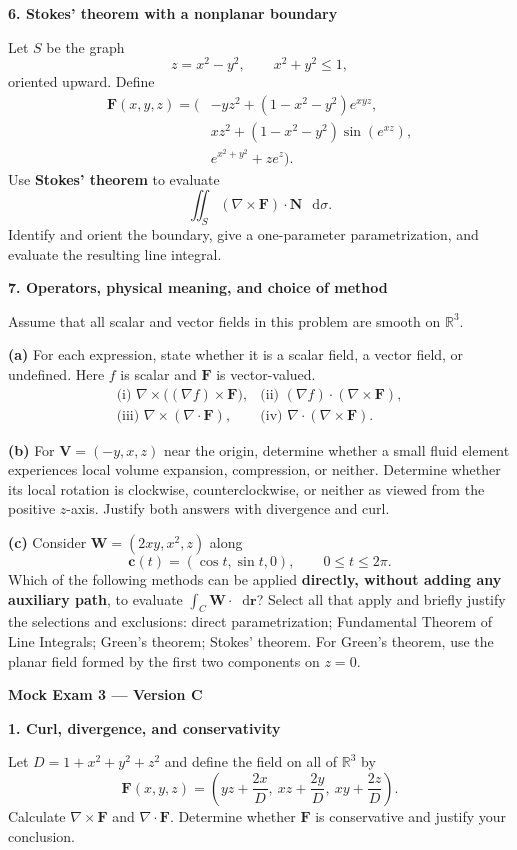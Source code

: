 \documentclass[11pt,letterpaper]{article}
\newcommand{\curl}{\nabla\times}
\newcommand{\dv}{\nabla\cdot}
\renewcommand{\vec}[1]{\mathbf{#1}}
\newcommand{\dd}{\mathop{}\!\mathrm{d}}
\newcommand{\grad}{\nabla}
\newcommand{\examproblem}[3]{%
  \par\medskip\Needspace{5\baselineskip}
  \noindent\textbf{#1. #2}\par\nobreak
}
\begin{document}
\examproblem{6}{Stokes' theorem with a nonplanar boundary}{20}
Let $S$ be the graph
\[
z=x^2-y^2,\qquad x^2+y^2\le1,
\]
oriented upward. Define
\[
\begin{aligned}
\vec F(x,y,z)=\bigl(&-yz^2+(1-x^2-y^2)e^{xyz},\\
&xz^2+(1-x^2-y^2)\sin(e^{xz}),\\
&e^{x^2+y^2}+ze^z\bigr).
\end{aligned}
\]
Use \textbf{Stokes' theorem} to evaluate
\[
\iint_S(\curl\vec F)\cdot\vec N\,\dd\sigma.
\]
Identify and orient the boundary, give a one-parameter parametrization,
and evaluate the resulting line integral.

\examproblem{7}{Operators, physical meaning, and choice of method}{14}
Assume that all scalar and vector fields in this problem are smooth on
$\mathbb R^3$.

\textbf{(a)} For each expression, state whether it is a scalar
field, a vector field, or undefined. Here $f$ is scalar and $\vec F$ is
vector-valued.
\[
\begin{array}{ll}
\text{(i) }\curl\bigl((\grad f)\times\vec F\bigr),&
\text{(ii) }(\grad f)\cdot(\curl\vec F),\\[3pt]
\text{(iii) }\curl(\dv\vec F),&
\text{(iv) }\dv(\curl\vec F).
\end{array}
\]

\textbf{(b)} For $\vec V=(-y,x,z)$ near the origin, determine
whether a small fluid element experiences local volume expansion,
compression, or neither. Determine whether its local rotation is
clockwise, counterclockwise, or neither as viewed from the positive
$z$-axis. Justify both answers with divergence and curl.

\textbf{(c)} Consider $\vec W=(2xy,x^2,z)$ along
\[
\vec c(t)=(\cos t,\sin t,0),\qquad0\le t\le2\pi.
\]
Which of the following methods can be applied \textbf{directly, without
adding any auxiliary path}, to evaluate
$\int_C\vec W\cdot\dd\vec r$? Select all that apply and briefly justify
the selections and exclusions: direct parametrization; Fundamental
Theorem of Line Integrals; Green's theorem; Stokes' theorem.
For Green's theorem, use the planar field formed by the first two
components on $z=0$.

\clearpage
\setcounter{page}{1}
{\large\bfseries Mock Exam 3 --- Version C}
\smallskip
\examproblem{1}{Curl, divergence, and conservativity}{10}
Let $D=1+x^2+y^2+z^2$ and define the field on all of $\mathbb R^3$ by
\[
\vec F(x,y,z)=\left(yz+\frac{2x}{D},\ xz+\frac{2y}{D},\ xy+\frac{2z}{D}\right).
\]
Calculate $\curl\vec F$ and $\dv\vec F$. Determine whether $\vec F$ is
conservative and justify your conclusion.
\end{document}
